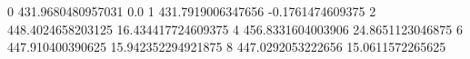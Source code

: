 0 431.9680480957031 0.0
1 431.7919006347656 -0.1761474609375
2 448.4024658203125 16.434417724609375
4 456.8331604003906 24.8651123046875
6 447.910400390625 15.942352294921875
8 447.0292053222656 15.0611572265625

